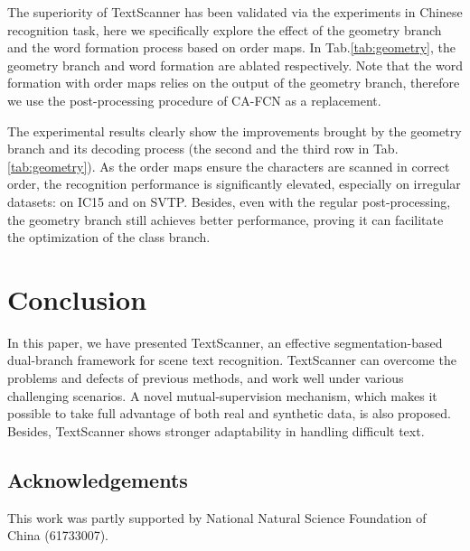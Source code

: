 \documentclass[letterpaper]{article} \usepackage{aaai20}  \usepackage{times}  \usepackage{helvet} \usepackage{courier}  \usepackage[hyphens]{url}  \usepackage{graphicx} \urlstyle{rm} \def\UrlFont{\rm}  \usepackage{graphicx}  \frenchspacing  \setlength{\pdfpagewidth}{8.5in}  \setlength{\pdfpageheight}{11in}
\begin{document}
The superiority of TextScanner has been validated via the experiments in Chinese recognition task, here we specifically explore the effect of the geometry branch and the word formation process based on order maps. In Tab.\ref{tab:geometry}, the geometry branch and word formation are ablated respectively. Note that the word formation with order maps relies on the output of the geometry branch, therefore we use the post-processing procedure of CA-FCN as a replacement.

The experimental results clearly show the improvements brought by the geometry branch and its decoding process (the second and the third row in Tab.\ref{tab:geometry}). As the order maps ensure the characters are scanned in correct order, the recognition performance is significantly elevated, especially on irregular datasets:  on IC15 and  on SVTP. Besides, even with the regular post-processing, the geometry branch still achieves better performance, proving it can facilitate the optimization of the class branch.

\section{Conclusion}

In this paper, we have presented TextScanner, an effective segmentation-based dual-branch framework for scene text recognition. TextScanner can overcome the problems and defects of previous methods, and work well under various challenging scenarios. A novel mutual-supervision mechanism, which makes it possible to take full advantage of both real and synthetic data, is also proposed. Besides, TextScanner shows stronger adaptability in handling difficult text.
\subsection*{Acknowledgements}
This work was partly supported by National Natural Science
Foundation of China (61733007).

{\fontsize{9.0pt}{10.0pt} \selectfont


}
\end{document}
